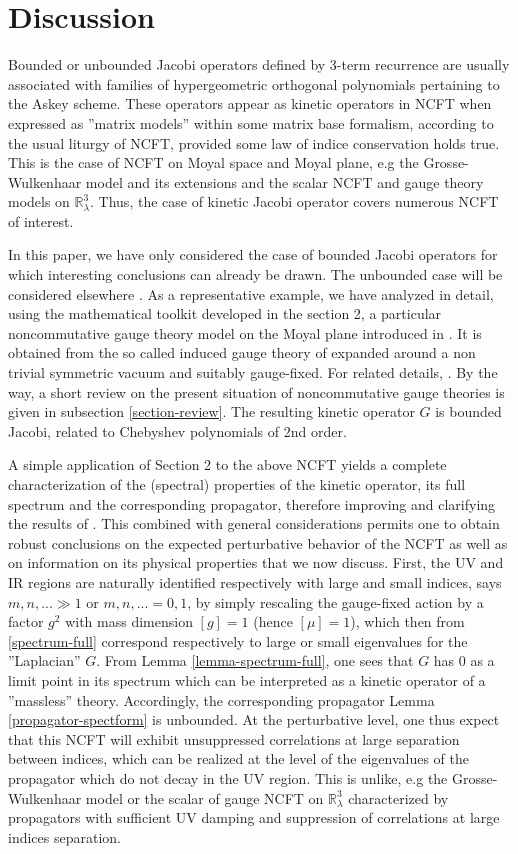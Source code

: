 \documentclass[a4paper,11pt,twoside]{article}
\numberwithin{equation}{section}
\theoremstyle{nonumberplain}
\newcounter{and}
\begin{document}
\section{Discussion}\label{discuss}
Bounded or unbounded Jacobi operators defined by 3-term recurrence are usually associated with families of hypergeometric orthogonal polynomials pertaining to the Askey scheme. These operators appear as kinetic operators in NCFT when expressed as ''matrix models'' within some matrix base formalism, according to the usual liturgy of NCFT, provided some law of indice conservation holds true. This is the case of NCFT on Moyal space and Moyal plane, e.g the Grosse-Wulkenhaar model and its extensions and the scalar NCFT and gauge theory models on $\mathbb{R}^3_\lambda$. Thus, the case of kinetic Jacobi operator covers numerous NCFT of interest. \par
In this paper, we have only considered the case of bounded Jacobi operators for which interesting conclusions can already be drawn. The unbounded case will be considered elsewhere \cite{unboud-jac}. As a representative example, we have analyzed in detail, using the mathematical toolkit developed in the section 2, a particular noncommutative gauge theory model on the Moyal plane introduced in \cite{MVW13}. It is obtained from the so called induced gauge theory of \cite{GWW,GW07} expanded around a non trivial symmetric vacuum and suitably gauge-fixed. For related details, \cite{MVW13}. By the way, a short review on the present situation of noncommutative gauge theories is given in subsection \ref{section-review}. The resulting kinetic operator $G$ is bounded Jacobi, related to Chebyshev polynomials of 2nd order.\par 
A simple application of Section 2 to the above NCFT yields a complete characterization of the (spectral) properties of the kinetic operator, its full spectrum and the corresponding propagator, therefore improving and clarifying the results of \cite{MVW13}. This combined with general considerations permits one to obtain robust conclusions on the expected perturbative behavior of the NCFT as well as on information on its physical properties that we now discuss. First, the UV and IR regions are naturally identified respectively with large and small indices, says $m,n,...\gg 1$ or $m,n,... =0,1$, by simply rescaling the gauge-fixed action by a factor $g^2$ with mass dimension $[g]=1$ (hence $[\mu]=1$), which then from \eqref{spectrum-full} correspond respectively to large or small eigenvalues for the ''Laplacian'' $G$.
From Lemma \ref{lemma-spectrum-full}, one sees that $G$ has $0$ as a limit point in its spectrum which can be interpreted as a kinetic operator of a ''massless'' theory. Accordingly, the corresponding propagator Lemma \ref{propagator-spectform} is unbounded. At the perturbative level, one thus expect that this NCFT will exhibit unsuppressed correlations at large separation between indices, which can be realized at the level of the eigenvalues of the propagator which do not decay in the UV region. This is unlike, e.g the Grosse-Wulkenhaar model \cite{gw1,gw2} or the scalar of gauge NCFT on $\mathbb{R}^3_\lambda$ \cite{gvw13} characterized by propagators with sufficient UV damping and suppression of correlations at large indices separation.\par
\end{document}

